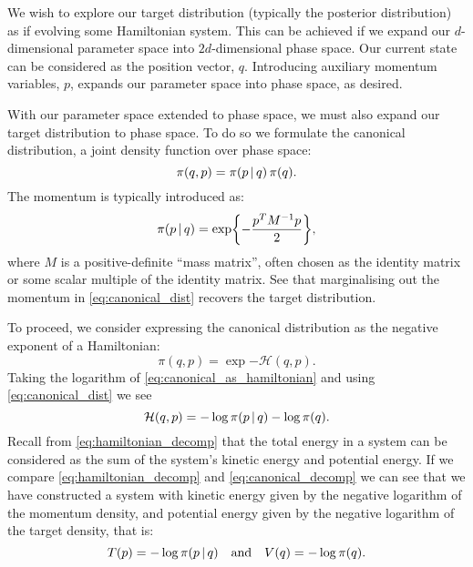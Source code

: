We wish to explore our target distribution (typically the posterior distribution) as if
evolving some Hamiltonian system. This can be achieved if we expand our $d$-dimensional
parameter space into $2d$-dimensional phase space. Our current state can be considered as
the position vector, $q$. Introducing auxiliary momentum variables, $p$, expands
our parameter space into phase space, as desired.

With our parameter space extended to phase space, we must also expand our target
distribution to phase space. To do so we formulate the canonical distribution, a joint
density function over phase space:
\begin{equation}
  \label{eq:canonical_dist}
  \pi(q, p) = \pi(p \,|\, q) \, \pi(q).
\end{equation}
The momentum is typically introduced as:
\begin{equation}
  \pi(p \,|\, q) = \exp{-\frac{p^T M^{-1} p}{2}},
\end{equation}
where $M$ is a positive-definite ``mass matrix'', often chosen as the identity matrix or
some scalar multiple of the identity matrix. See that marginalising out the momentum in
\cref{eq:canonical_dist} recovers the target distribution.

To proceed, we consider expressing the canonical distribution as the
negative exponent of a Hamiltonian:
\begin{equation}
  \label{eq:canonical_as_hamiltonian}
  \pi(q, p) = \exp{-\mathcal{H}(q,p)}.
\end{equation}
Taking the logarithm of \cref{eq:canonical_as_hamiltonian} and using \cref{eq:canonical_dist}
we see
\begin{equation}
  \label{eq:canonical_decomp}
  \mathcal{H}(q, p) = -\log{\pi(p \,|\,q)} - \log{\pi(q)}.
\end{equation}
Recall from \cref{eq:hamiltonian_decomp} that the total energy in a system can be
considered as the sum of the system's kinetic energy and potential energy.  If we compare
\cref{eq:hamiltonian_decomp} and \cref{eq:canonical_decomp} we can see that we have
constructed a system with kinetic energy given by the negative logarithm of the momentum
density, and potential energy given by the negative logarithm of the target density, that
is:
\begin{equation*}
    T(p) = -\log{\pi(p \,|\,q)} \quad\text{and}\quad V(q) = -\log{\pi(q)}.
\end{equation*}

